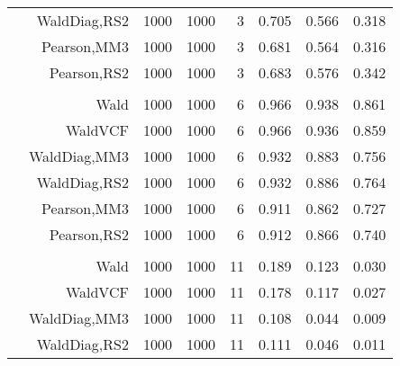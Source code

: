 \documentclass[
]{article}
\begin{document}
\begin{table}[H]
{\begin{tabular}[t]{lrrrrrrr}
\hspace{1em} & WaldDiag,RS2 & 1000 & 1000 & 3 & 0.705 & 0.566 & 0.318\\

\hspace{1em} & Pearson,MM3 & 1000 & 1000 & 3 & 0.681 & 0.564 & 0.316\\

\hspace{1em} & Pearson,RS2 & 1000 & 1000 & 3 & 0.683 & 0.576 & 0.342\\
\cmidrule{1-8}
\addlinespace[0.3em]
\multicolumn{8}{l}{\textbf{1F 15V}}\\
\hspace{1em} & Wald & 1000 & 1000 & 6 & 0.966 & 0.938 & 0.861\\

\hspace{1em} & WaldVCF & 1000 & 1000 & 6 & 0.966 & 0.936 & 0.859\\

\hspace{1em} & WaldDiag,MM3 & 1000 & 1000 & 6 & 0.932 & 0.883 & 0.756\\

\hspace{1em} & WaldDiag,RS2 & 1000 & 1000 & 6 & 0.932 & 0.886 & 0.764\\

\hspace{1em} & Pearson,MM3 & 1000 & 1000 & 6 & 0.911 & 0.862 & 0.727\\

\hspace{1em} & Pearson,RS2 & 1000 & 1000 & 6 & 0.912 & 0.866 & 0.740\\
\cmidrule{1-8}
\addlinespace[0.3em]
\multicolumn{8}{l}{\textbf{2F 10V}}\\
\hspace{1em} & Wald & 1000 & 1000 & 11 & 0.189 & 0.123 & 0.030\\

\hspace{1em} & WaldVCF & 1000 & 1000 & 11 & 0.178 & 0.117 & 0.027\\

\hspace{1em} & WaldDiag,MM3 & 1000 & 1000 & 11 & 0.108 & 0.044 & 0.009\\

\hspace{1em} & WaldDiag,RS2 & 1000 & 1000 & 11 & 0.111 & 0.046 & 0.011\\


\end{tabular}}
\end{table}
\end{document}
